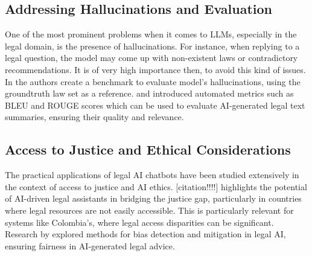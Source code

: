 \subsection{Addressing Hallucinations and Evaluation}
One of the most prominent problems when it comes to LLMs, especially in the legal domain, 
is the presence of hallucinations. For instance, when replying to a legal question, 
the model may come up with non-existent laws or contradictory recommendations. 
It is of very high importance then, to avoid this kind of issues. 
In \cite{hu2025finetuninglargelanguagemodels} the authors create a benchmark 
to evaluate model's hallucinations, using the groundtruth law set as a reference.
\cite{Papineni_bleu} and \cite{lin-2004-rouge} introduced automated metrics 
such as BLEU and ROUGE scores which can be used to evaluate AI-generated 
legal text summaries, ensuring their quality and relevance.

\subsection{Access to Justice and Ethical Considerations}
The practical applications of legal AI chatbots have been studied extensively 
in the context of access to justice and AI ethics. 
[citation!!!!] highlights the potential of AI-driven legal assistants in bridging 
the justice gap, particularly in countries where legal resources are not easily 
accessible. This is particularly relevant for systems like Colombia's, 
where legal access disparities can be significant. 
Research by \cite{Min_bias} explored methods for bias detection and mitigation 
in legal AI, ensuring fairness in AI-generated legal advice.

